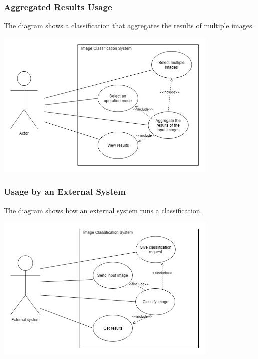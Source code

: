 \documentclass[parskip=full]{scrartcl}
\begin{document}
\subsubsection {Aggregated Results Usage}

The diagram shows a classification that aggregates the results of multiple images. 

\begin{center}
\includegraphics[width=0.8\textwidth]{UseCases/AggregateUCD.jpg}
\end{center}

\pagebreak



\subsubsection {Usage by an External System}

The diagram shows how an external system runs a classification. 

\begin{center}
\includegraphics[width=0.8\textwidth]{UseCases/ExtenalSystemUCD.jpg}
\end{center}
\end{document}
